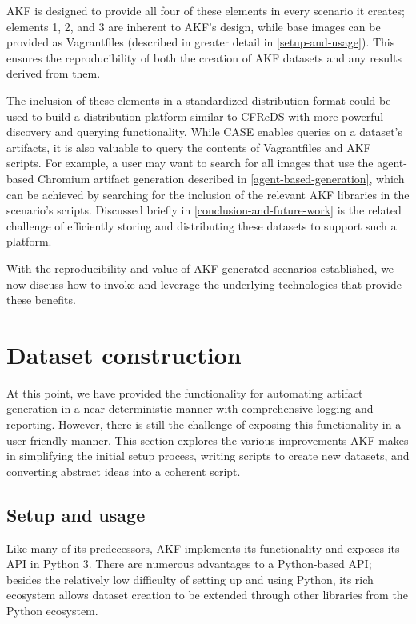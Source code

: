 \documentclass[final,5p,times,twocolumn]{elsarticle}
\begin{document}
AKF is designed to provide all four of these elements in every scenario
it creates; elements 1, 2, and 3 are inherent to AKF's design, while
base images can be provided as Vagrantfiles (described in greater detail
in \autoref{setup-and-usage}). This ensures the reproducibility of both
the creation of AKF datasets and any results derived from them.

The inclusion of these elements in a standardized distribution format
could be used to build a distribution platform similar to CFReDS with
more powerful discovery and querying functionality. While CASE enables
queries on a dataset's artifacts, it is also valuable to query the
contents of Vagrantfiles and AKF scripts. For example, a user may want
to search for all images that use the agent-based Chromium artifact
generation described in \autoref{agent-based-generation}, which can be
achieved by searching for the inclusion of the relevant AKF libraries in
the scenario's scripts. Discussed briefly in \autoref{conclusion-and-future-work} is the related challenge of efficiently storing and
distributing these datasets to support such a platform.

With the reproducibility and value of AKF-generated scenarios
established, we now discuss how to invoke and leverage the underlying
technologies that provide these benefits.

\section{Dataset construction}\label{dataset-construction}

At this point, we have provided the functionality for automating
artifact generation in a near-deterministic manner with comprehensive
logging and reporting. However, there is still the challenge of exposing
this functionality in a user-friendly manner. This section explores the
various improvements AKF makes in simplifying the initial setup process,
writing scripts to create new datasets, and converting abstract ideas
into a coherent script.

\subsection{Setup and usage}\label{setup-and-usage}

Like many of its predecessors, AKF implements its functionality and
exposes its API in Python 3. There are numerous advantages to a
Python-based API; besides the relatively low difficulty of setting up
and using Python, its rich ecosystem allows dataset creation to be
extended through other libraries from the Python ecosystem.
\end{document}
